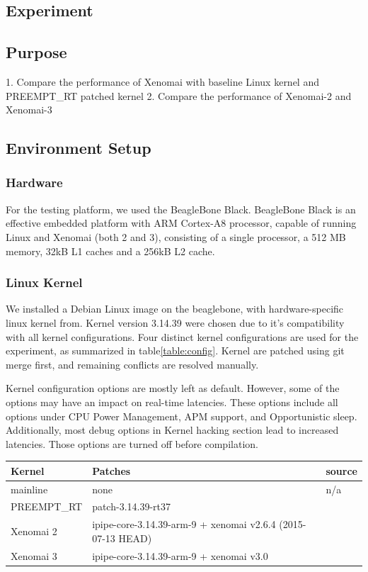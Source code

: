 \documentclass[10pt,a4paper]{article}
\begin{document}
\begin{multicols}{2}
\section{Experiment}

\subsection{Purpose}
1. Compare the performance of Xenomai with baseline Linux kernel and PREEMPT\_RT patched kernel
2. Compare the performance of Xenomai-2 and Xenomai-3
\subsection{Environment Setup}

\subsubsection{Hardware}
For the testing platform, we used the BeagleBone Black. BeagleBone Black is an effective embedded platform with ARM Cortex-A8 processor, capable of running Linux and Xenomai (both 2 and 3), consisting of a single processor, a 512 MB memory, 32kB L1 caches and a 256kB L2 cache.  

\subsubsection{Linux Kernel}
We installed a Debian Linux image\cite{debian} on the beaglebone, with hardware-specific linux kernel from\cite{kernel}. Kernel version 3.14.39 were chosen due to it's compatibility with all kernel configurations.
Four distinct kernel configurations are used for the experiment, as summarized in table\ref{table:config}. Kernel are patched using git merge first, and remaining conflicts are resolved manually.

Kernel conﬁguration options are mostly left as default. However, some of the options may have an impact on real-time latencies. These options include all options under CPU Power Management, APM support, and Opportunistic sleep. Additionally, most debug options in Kernel hacking section lead to increased latencies. Those options are turned off before compilation.

\begin{tabular}{|l| p{3cm} |l|}
\hline
Kernel & Patches & source\\ \hline
mainline   & none & n/a \\ \hline
PREEMPT\_RT & patch-3.14.39-rt37 & \cite{p-rt} \\ \hline
Xenomai 2  & ipipe-core-3.14.39-arm-9 + xenomai v2.6.4 (2015-07-13 HEAD) & \cite{p-ipipe} \cite{git-x2.6} \\ \hline
Xenomai 3  & ipipe-core-3.14.39-arm-9 + xenomai v3.0  & \cite{p-ipipe} \cite{git-x3} \\ \hline
\end{tabular}


\end{multicols}
\end{document}
